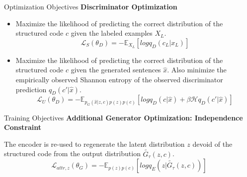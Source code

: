 \documentclass{beamer}
\begin{document}
  \begin{frame}{Optimization Objectives}
    \textbf{Discriminator Optimization} 

    \begin{itemize}
      \item Maximize the likelihood of predicting the correct distribution of the structured code $c$ given the labeled examples $X_L$.
      \begin{equation*}
        \mathcal{L}_S(\theta_D) = - \mathbb{E}_{X_L}[log q_D(c_L|x_L)]
      \end{equation*}
      \item Maximize the likelihood of predicting the correct distribution of the structured code $c$ given the generated sentences $\hat{x}$. Also minimize the empirically observed Shannon entropy of the observed discriminator prediction $q_D(c'|\hat{x})$.
      \begin{equation*}
        \mathcal{L}_U(\theta_D) = - \mathbb{E}_{p_G(\hat{x}|z,c)p(z)p(c)} 
        [log q_D(c|\hat{x}) + \beta \mathcal{H} q_D(c'|\hat{x})]
      \end{equation*}
    \end{itemize}
  \end{frame}

  \begin{frame}{Training Objectives}
    \textbf{Additional Generator Optimization: Independence Constraint}
    
    The encoder is re-used to regenerate the latent distribution $z$ devoid of the structured code from the output distribution $\tilde{G_{\tau}}(z,c)$. 
    \begin{equation*}
      \mathcal{L}_{attr, z}(\theta_G) = - \mathbb{E}_{p(z)p(c)} 
      [log q_E(z|\tilde{G_{\tau}}(z,c))]
    \end{equation*}
  \end{frame}
\end{document}
